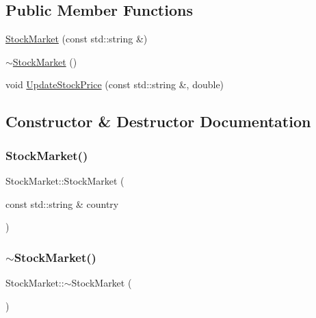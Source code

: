\subsection*{Public Member Functions}
\begin{DoxyCompactItemize}
\item 
\mbox{\hyperlink{class_stock_market_a426f20173ec7cfdd910826da2b8bf237}{Stock\+Market}} (const std\+::string \&)
\item 
\mbox{\hyperlink{class_stock_market_a85d89b5a611d94f0679497b49ff2e768}{$\sim$\+Stock\+Market}} ()
\item 
void \mbox{\hyperlink{class_stock_market_a3892e4e02e76097244ae3f2c5265a216}{Update\+Stock\+Price}} (const std\+::string \&, double)
\end{DoxyCompactItemize}


\subsection{Constructor \& Destructor Documentation}
\mbox{\label{class_stock_market_a426f20173ec7cfdd910826da2b8bf237}} 
\subsubsection{\texorpdfstring{StockMarket()}{StockMarket()}}
{\footnotesize\ttfamily Stock\+Market\+::\+Stock\+Market (\begin{DoxyParamCaption}\item[{const std\+::string \&}]{country }\end{DoxyParamCaption})}

\mbox{\label{class_stock_market_a85d89b5a611d94f0679497b49ff2e768}} 
\subsubsection{\texorpdfstring{$\sim$StockMarket()}{~StockMarket()}}
{\footnotesize\ttfamily Stock\+Market\+::$\sim$\+Stock\+Market (\begin{DoxyParamCaption}{ }\end{DoxyParamCaption})}



